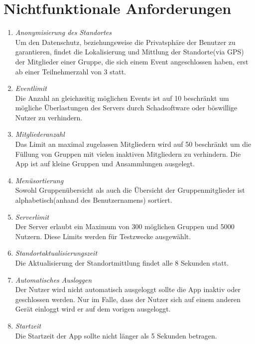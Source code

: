 \documentclass[parskip=full]{scrartcl}
\def\threedigits#1{%
  \ifnum#1<100 0\fi
  \ifnum#1<10 0\fi
  \number#1}
\begin{document}
\newpage
\section{Nichtfunktionale Anforderungen}
\begin{enumerate}[label={\textbf{/NF\protect\threedigits{\theenumi}0/}}, leftmargin=*]
		\item \textit{Anonymisierung des Standortes} \\
		Um den Datenschutz, beziehungsweise die Privatsphäre der Benutzer zu garantieren, findet die Lokalisierung und Mittlung der Standorte(via GPS) der Mitglieder einer Gruppe, die sich einem Event angeschlossen haben, erst ab einer Teilnehmerzahl von 3 statt. 
		
		\item \textit{Eventlimit} \\
		Die Anzahl an gleichzeitig möglichen Events ist auf 10 beschränkt um mögliche Überlastungen des Servers durch Schadsoftware oder böswillige Nutzer zu verhindern.
		
		\item \textit{Mitgliederanzahl} \\
		Das Limit an maximal zugelassen Mitgliedern wird auf 50 beschränkt um die Füllung von Gruppen mit vielen inaktiven Mitgliedern zu verhindern. Die App ist auf kleine Gruppen und Ansammlungen ausgelegt.
		
		\item \textit{Menüsortierung} \\
		Sowohl Gruppenübersicht als auch die Übersicht der Gruppenmitglieder ist alphabetisch(anhand des Benutzernamens) sortiert. 
		
		\item \textit{Serverlimit} \\
		Der Server erlaubt ein Maximum von 300 möglichen Gruppen und 5000 Nutzern.
		Diese Limits werden für Testzwecke ausgewählt.
		
		\item \textit{Standortaktualisierungszeit} \\
		Die Aktualisierung der Standortmittlung findet alle 8 Sekunden statt.
		
		\item \textit{Automatisches Ausloggen} \\
		Der Nutzer wird nicht automatisch ausgeloggt sollte die App inaktiv oder geschlossen werden. Nur im Falle, dass der Nutzer sich auf einem anderen Gerät einloggt wird er auf dem vorigen ausgeloggt.
		
		\item \textit{Startzeit} \\
		Die Startzeit der App sollte nicht länger als 5 Sekunden betragen.
		
\end{enumerate}
\end{document}
